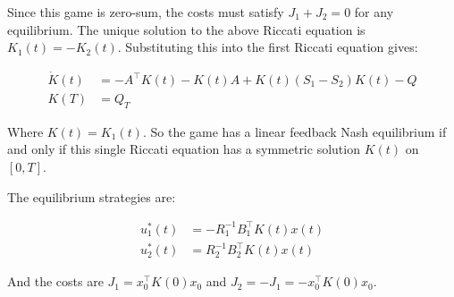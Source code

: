 \documentclass[3p]{elsarticle}
\begin{document}
Since this game is zero-sum, the costs must satisfy $J_1 + J_2 = 0$ for any equilibrium. The unique solution to the above Riccati equation is $K_1(t) = -K_2(t)$. Substituting this into the first Riccati equation gives:

\begin{align*} 
\dot{K}(t) &= -A^\top K(t) - K(t)A + K(t)(S_1-S_2)K(t) - Q \\
K(T) &= Q_T
\end{align*}

Where $K(t) = K_1(t)$. So the game has a linear feedback Nash equilibrium if and only if this single Riccati equation has a symmetric solution $K(t)$ on $[0,T]$. 

The equilibrium strategies are:

\begin{align*}
u_1^*(t) &= -R_1^{-1}B_1^\top K(t) x(t) \\ 
u_2^*(t) &= R_2^{-1}B_2^\top K(t) x(t)
\end{align*}

And the costs are $J_1 = x_0^\top K(0) x_0$ and $J_2 = -J_1 = -x_0^\top K(0) x_0$.


\end{document}
